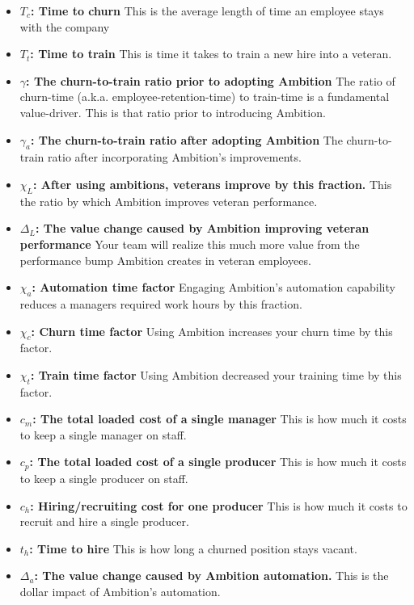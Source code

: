 \documentclass[paper=a4, fontsize=11pt abstract]{scrartcl}
\numberwithin{equation}{section}		%
\numberwithin{figure}{section}			%
\numberwithin{table}{section}				%
\begin{document}
\begin{itemize}
    \item $T_c$\textbf{: Time to churn} This is the average length of time an employee stays with the company
    
    \item $T_t$\textbf{: Time to train} This is time it takes to train a new hire into a veteran.
    
    \item $\gamma$\textbf{: The churn-to-train ratio prior to adopting Ambition} The ratio of churn-time (a.k.a. employee-retention-time) to train-time is a fundamental value-driver.  This is that ratio prior to introducing Ambition.
    
    \item $\gamma_a$\textbf{: The churn-to-train ratio after adopting Ambition} The churn-to-train ratio after incorporating Ambition's improvements.
    
    \item $\chi_L$\textbf{: After using ambitions, veterans improve by this fraction.} This the ratio by which Ambition improves veteran performance.
    
    \item $\Delta_L$\textbf{: The value change caused by Ambition improving veteran performance} Your team will realize this much more value from the performance bump Ambition creates in veteran employees.
    
    \item $\chi_a$\textbf{: Automation time factor} Engaging Ambition's automation capability reduces a managers required work hours by this fraction.
    
    \item $\chi_c$\textbf{: Churn time factor} Using Ambition increases your churn time by this factor.
    
    \item $\chi_t$\textbf{: Train time factor} Using Ambition decreased your training time by this factor.
    
    \item $c_m$\textbf{: The total loaded cost of a single manager} This is how much it costs to keep a single manager on staff.
    
    \item $c_p$\textbf{: The total loaded cost of a single producer} This is how much it costs to keep a single producer on staff.
    
    \item $c_h$\textbf{: Hiring/recruiting cost for one producer} This is how much it costs to recruit and hire a single producer.
    
    \item $t_h$\textbf{: Time to hire} This is how long a churned position stays vacant.
    
    \item $\Delta_a$\textbf{: The value change caused by Ambition automation.} This is the dollar impact of Ambition's automation.
\end{itemize}
\end{document}
